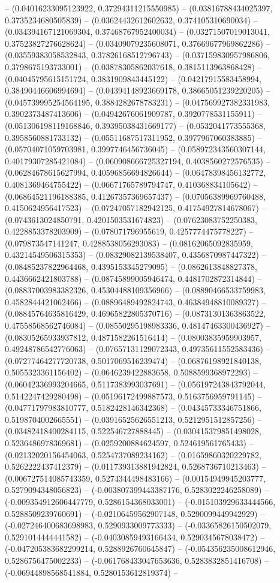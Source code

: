 -- (0.04016233095123922, 0.37294311215550985) -- (0.03816788434025397, 0.3735234680505839) -- (0.03624432612602632, 0.374105310690034) -- (0.034394167121069304, 0.37468767952400034) -- (0.03271507019013041, 0.37523827276628624) -- (0.03409079235608071, 0.37669677969862286) -- (0.03559383058532843, 0.37826168512796743) -- (0.037159830957986806, 0.3798675193733001) -- (0.03878305862037618, 0.3815113963868428) -- (0.04045795615151724, 0.3831909843445122) -- (0.04217915583458994, 0.38490446606994694) -- (0.04394148923669178, 0.38665051239220205) -- (0.045739995254564195, 0.3884282678783231) -- (0.047569927382331983, 0.3902373487413606) -- (0.04942676061909787, 0.3920778531155911) -- (0.051306198119168846, 0.39395038431669177) -- (0.0532041773555368, 0.3958560881733132) -- (0.05511687517311952, 0.3977967060383885) -- (0.05704071059703981, 0.3997746456736045) -- (0.058972343560307144, 0.40179307285421084) -- (0.060908666725327194, 0.4038560272576535) -- (0.06284678615627994, 0.40596856694826644) -- (0.06478398456132772, 0.4081369464755422) -- (0.06671765789794747, 0.410368834105642) -- (0.06864521196188385, 0.41267357369657437) -- (0.07056389969760488, 0.4150624956417523) -- (0.07247057182942125, 0.41754927814678067) -- (0.0743613024850791, 0.4201503531674823) -- (0.07623083752250383, 0.4228853378203909) -- (0.078071796955619, 0.4257774475778227) -- (0.079873547141247, 0.4288538056293083) -- (0.08162065092835959, 0.43214549506315353) -- (0.08329082139538407, 0.4356870987447322) -- (0.08485237822964468, 0.4395153345279095) -- (0.0862613848827378, 0.4436662421803788) -- (0.08745899005946474, 0.4481702872314844) -- (0.08837003983382326, 0.45304488109356966) -- (0.08890466533759983, 0.4582844421062466) -- (0.08896489492824743, 0.46384948810089327) -- (0.08845764635816429, 0.46965822805370716) -- (0.08731301363863522, 0.47558568562746084) -- (0.08550295198983336, 0.48147463300436927) -- (0.08305265933937812, 0.4871582261516414) -- (0.08003835959903957, 0.49248786542776063) -- (0.07657131129072343, 0.49735611552583436) -- (0.07277464277720738, 0.5017069516239474) -- (0.06876198921840138, 0.5055323361156402) -- (0.0646239422883658, 0.5088599368972293) -- (0.06042336993204665, 0.5117383993037691) -- (0.056197243843792044, 0.5142247429280498) -- (0.05196172499887573, 0.5163756959791145) -- (0.04771797983810777, 0.5182428146342368) -- (0.04345733346751866, 0.5198704002665551) -- (0.03916525626551213, 0.5212951512857256) -- (0.03482418400284115, 0.522546727888445) -- (0.030415379851498028, 0.5236486978369681) -- (0.0259200884624597, 0.524619561765433) -- (0.02132020156454063, 0.5254737089234162) -- (0.01659860320229782, 0.5262222437412379) -- (0.011739313881942824, 0.5268736710213463) -- (0.006727514085743359, 0.5274344498483166) -- (0.00154949945203777, 0.5279094348056823) -- (-0.003807399443387176, 0.5283022246258089) -- (-0.009354912606447779, 0.5286154368033001) -- (-0.015103929633444566, 0.5288509239760691) -- (-0.02106459562907148, 0.5290099449942929) -- (-0.027246400683698983, 0.5290933009773333) -- (-0.03365826150502079, 0.5291014444441582) -- (-0.04030859493166434, 0.5290345678038472) -- (-0.047205383682299214, 0.5288926760645847) -- (-0.054356235008612946, 0.5286756475002233) -- (-0.061768433047653636, 0.5283832851416708) -- (-0.06944898568541884, 0.5280153612819374) -- 